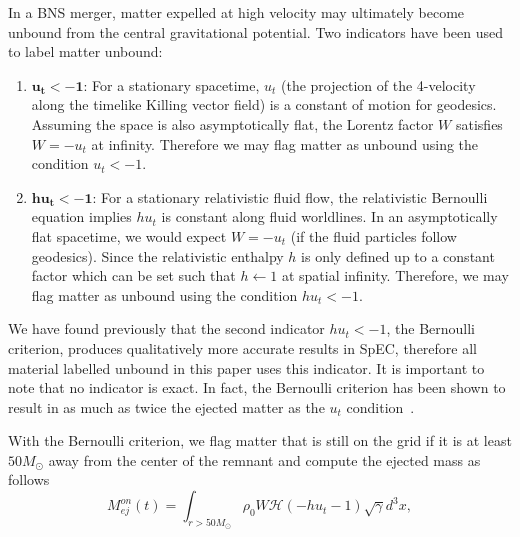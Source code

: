 In a BNS merger, matter expelled at high velocity may
ultimately become unbound from the central gravitational potential. Two indicators have been used to label matter unbound:
%
\begin{enumerate}
\item{$\mathbf{u_t < -1}$: For a stationary spacetime, $u_t$ (the projection of the 4-velocity along the timelike Killing vector field) is a constant of motion for geodesics. Assuming the space is also asymptotically flat, the Lorentz factor $W$ satisfies $W = -u_t$ at infinity. Therefore we may flag matter as unbound using the condition  $u_t < -1$.} \\
\item{$\mathbf{hu_t < -1}$: For a stationary relativistic fluid flow, the relativistic Bernoulli equation \cite{rezzolla2013relativistic} implies $hu_t$ is constant along fluid worldlines. In an asymptotically flat spacetime, we would expect $W = -u_t$ (if the fluid particles follow geodesics). Since the relativistic enthalpy $h$ is only defined up to a constant factor which can be set such that $h \leftarrow 1$ at spatial infinity. Therefore, we may flag matter as unbound using the condition $hu_t < -1$.
}
\end{enumerate}

We have found previously \cite{foucart:2015gaa} that the second indicator $hu_t < -1$, the Bernoulli criterion, produces
qualitatively more accurate results in SpEC, therefore all material labelled unbound in this paper uses this indicator. It is important to note that no indicator is exact.  In fact, the Bernoulli criterion has been shown to result in as much as twice the ejected matter as the $u_t$ condition~\cite{kastaun:2014fna}. 

With the Bernoulli criterion, we flag matter that is still on the grid if it is at least $50M_\odot$ away from the center of the remnant and compute the ejected mass as follows
%
\begin{equation}
M^{on}_{ej}(t) = \int_{r>50M_\odot}\rho_0 W\mathcal{H}(-hu_t - 1)\sqrt{\gamma}{d}^3x,
\end{equation}
%


